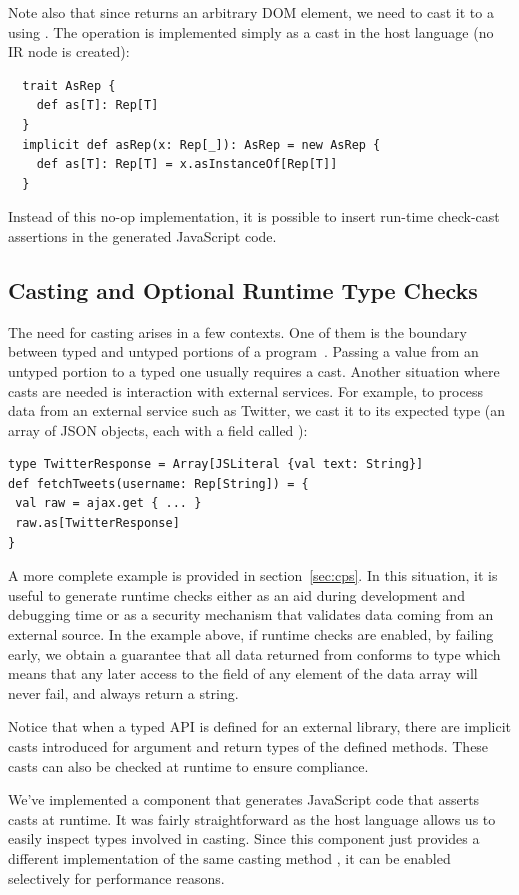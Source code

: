 \documentclass[runningheads,a4paper]{llncs}
\begin{document}
Note also that since  returns an arbitrary DOM
element, we need to cast it to a  using
. The  operation is implemented simply as a cast in the
host language (no IR node is created):
\begin{lstlisting}
  trait AsRep {
    def as[T]: Rep[T]
  }
  implicit def asRep(x: Rep[_]): AsRep = new AsRep {
    def as[T]: Rep[T] = x.asInstanceOf[Rep[T]]
  }
\end{lstlisting}
Instead of this no-op implementation, it is possible to insert
run-time check-cast assertions in the generated JavaScript code.

\subsection{Casting and Optional Runtime Type Checks}\label{sec:casting}
The need for casting arises in a few contexts. One of them is the
boundary between typed and untyped portions of a
program~\cite{wadler-blame,blame-for-all}. Passing a value from an
untyped portion to a typed one usually requires a cast. Another
situation where casts are needed is interaction with external
services. For example, to process data from an external service such
as Twitter, we cast it to its expected type (an array of JSON objects, each with a field called ):
\begin{lstlisting}
type TwitterResponse = Array[JSLiteral {val text: String}]
def fetchTweets(username: Rep[String]) = {
 val raw = ajax.get { ... }
 raw.as[TwitterResponse]
}
\end{lstlisting}
A more complete example is provided in section~\ref{sec:cps}. In this
situation, it is useful to generate runtime checks either as an aid
during development and debugging time or as a security mechanism that
validates data coming from an external source. In the example above,
if runtime checks are enabled, by failing early, we obtain a guarantee
that all data returned from  conforms to type
 which means that any later access to the
 field of any element of the data array will never fail, and
always return a string.

Notice that when a typed API is defined for an external library, there
are implicit casts introduced for argument and return types of the
defined methods. These casts can also be checked at runtime to
ensure compliance.

We've implemented a component that generates JavaScript code that
asserts casts at runtime. It was fairly straightforward as the host
language allows us to easily inspect types involved in casting. Since
this component just provides a different implementation of the same
casting method , it can be enabled selectively for
performance reasons.
\end{document}
